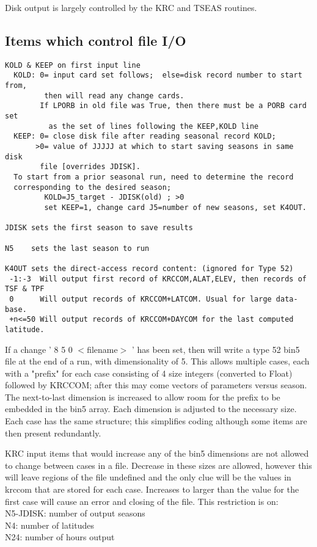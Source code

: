 \documentclass{article}
\newcommand{\qi}{\\ \hspace*{2.em}}      %
\begin{document}
Disk output is largely controlled by the KRC and TSEAS routines.

\subsection{Items which control file I/O } %
\vspace{-3.mm} 
\begin{verbatim}
KOLD & KEEP on first input line
  KOLD: 0= input card set follows;  else=disk record number to start from,
         then will read any change cards.
        If LPORB in old file was True, then there must be a PORB card set 
          as the set of lines following the KEEP,KOLD line
  KEEP: 0= close disk file after reading seasonal record KOLD;
       >0= value of JJJJJ at which to start saving seasons in same disk 
        file [overrides JDISK].
  To start from a prior seasonal run, need to determine the record 
  corresponding to the desired season;
         KOLD=J5_target - JDISK(old) ; >0
         set KEEP=1, change card J5=number of new seasons, set K4OUT.

JDISK sets the first season to save results

N5    sets the last season to run

K4OUT sets the direct-access record content: (ignored for Type 52)
 -1:-3  Will output first record of KRCCOM,ALAT,ELEV, then records of TSF & TPF
 0      Will output records of KRCCOM+LATCOM. Usual for large data-base.
 +n<=50 Will output records of KRCCOM+DAYCOM for the last computed latitude.
\end{verbatim}

If a change ' 8 5 0 $<$filename$>$ ' has been set, then will write a type 52
bin5 file at the end of a run, with dimensionality of 5. This allows multiple
cases, each with a "prefix" for each case consisting of 4 size integers
(converted to Float) followed by KRCCOM; after this may come vectors of
parameters versus season. The next-to-last dimension is increased to allow room
for the prefix to be embedded in the bin5 array.  Each dimension is adjusted to
the necessary size. Each case has the same structure; this simplifies coding
although some items are then present redundantly.

KRC input items that would increase any of the bin5 dimensions are not allowed
to change between cases in a file. Decrease in these sizes are allowed, however
this will leave regions of the file undefined and the only clue will be the
values in krccom that are stored for each case. Increases to larger than the
value for the first case will cause an error and closing of the file. This
restriction is on:
\qi N5-JDISK: number of output seasons
\qi N4: number of latitudes
\qi N24: number of hours output
\end{document}
